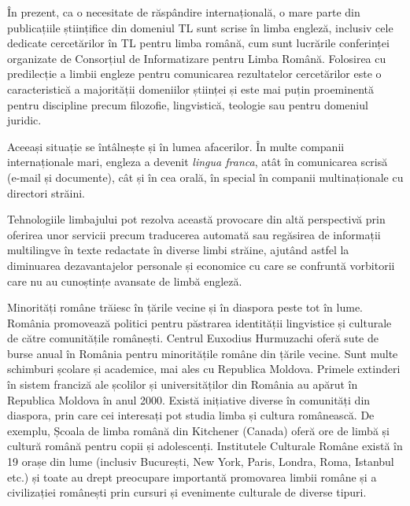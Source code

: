 \begin{multicols}{2}
În prezent, ca o necesitate de răspândire internațională, o mare parte din publicațiile științifice din domeniul TL sunt scrise în limba engleză, inclusiv cele dedicate cercetărilor în TL pentru limba română, cum sunt lucrările conferinței organizate de Consorțiul de Informatizare pentru Limba Română. Folosirea cu predilecție a limbii engleze pentru comunicarea rezultatelor cercetărilor este o caracteristică a majorității domeniilor științei și este mai puțin proeminentă pentru discipline precum filozofie, lingvistică, teologie sau pentru domeniul juridic.



Aceeași situație se întâlnește și în lumea afacerilor. În multe companii internaționale mari, engleza a devenit \textit{lingua franca}, atât în comunicarea scrisă (e-mail și documente), cât și în cea orală, în special în companii multinaționale cu directori străini.

Tehnologiile limbajului pot rezolva această provocare din altă perspectivă prin oferirea unor servicii precum traducerea automată sau regăsirea de informații multilingve în texte redactate în diverse limbi străine, ajutând astfel la diminuarea dezavantajelor personale și economice cu care se confruntă vorbitorii care nu au cunoștințe avansate de limbă engleză.

Minorități române trăiesc în țările vecine și în diaspora peste tot în lume. România promovează politici pentru păstrarea identității lingvistice și culturale de către comunitățile românești. Centrul Euxodius Hurmuzachi oferă sute de burse anual în România pentru minoritățile române din țările vecine. Sunt multe schimburi școlare și academice, mai ales cu Republica Moldova. Primele extinderi în sistem franciză ale școlilor și universităților din România au apărut în Republica Moldova în anul 2000.
Există inițiative diverse în comunități din diaspora, prin care cei interesați pot studia limba și cultura românească. De exemplu, Școala de limba română din Kitchener (Canada) oferă ore de limbă și cultură română pentru copii și adolescenți.
Institutele Culturale Române există în 19 orașe din lume (inclusiv București, New York, Paris, Londra, Roma, Istanbul etc.) și toate au drept preocupare importantă promovarea limbii române și a civilizației românești prin cursuri și evenimente culturale de diverse tipuri.


\end{multicols}
